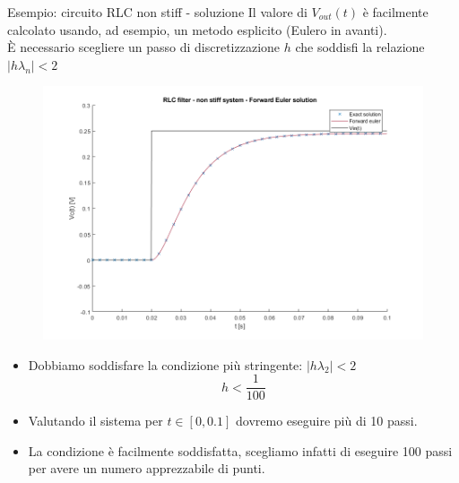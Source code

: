 \documentclass[aspectratio=169, 10pt, handout,usenames,dvipsnames]{beamer}
\begin{document}
\begin{frame}{Esempio: circuito RLC \alert{non} stiff - soluzione}
Il valore di \( V_{out}(t) \) è facilmente calcolato usando, ad esempio, un metodo esplicito (Eulero in avanti).\\ \medskip
È necessario scegliere un passo di discretizzazione $h$ che soddisfi la relazione $|h \lambda_n| < 2$\\     \bigskip
    \begin{multicols}{2}
        \begin{figure}
       \centering        \includegraphics[width=1.05\linewidth]{rlc_non_stiff_forward_euler.png}
        \label{fig:fe_nonstiff}
        \end{figure}
    \columnbreak
    \begin{itemize}
    \item Dobbiamo soddisfare la condizione più stringente: $|h \lambda_2| < 2$
    \[
    h < \dfrac{1}{100}
    \]
    \item Valutando il sistema per $t\in [0,0.1]$ dovremo eseguire \alert{più di 10 passi}.
    \item La condizione è facilmente soddisfatta, scegliamo infatti di eseguire 100 passi per avere un numero apprezzabile di punti.
    \end{itemize}
    \end{multicols}

\end{frame}
\end{document}
